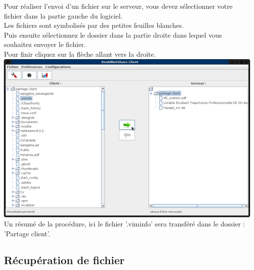 \documentclass[12pt,a4paper]{article}
\begin{document}
\begin{center}
	Pour réaliser l'envoi d'un fichier sur le serveur, vous devez sélectionner votre fichier dans la partie gauche du logiciel. \\
	Les fichiers sont symbolisés par des petites feuilles blanches. \\
	Puis ensuite sélectionnez le dossier dans la partie droite dans lequel vous souhaitez envoyer le fichier. \\
	Pour finir cliquez sur la flèche allant vers la droite. \\
	\includegraphics[scale=0.4]{images/envoi.png}
	Un résumé de la procédure, ici le fichier '.viminfo' sera transféré dans le dossier : 'Partage client'. 

\end{center}

\subsection{Récupération de fichier}
\end{document}
